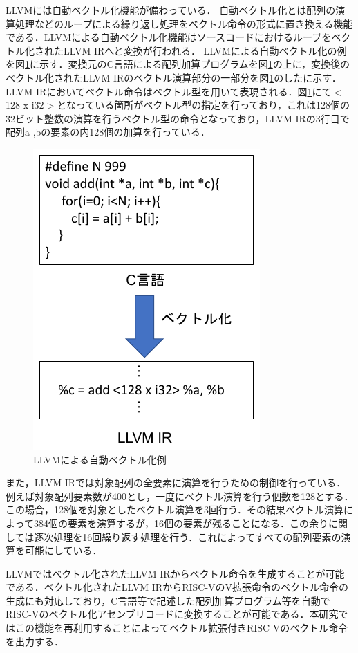 
LLVMには自動ベクトル化機能が備わっている．
自動ベクトル化とは配列の演算処理などのループによる繰り返し処理をベクトル命令の形式に置き換える機能である．LLVMによる自動ベクトル化機能はソースコードにおけるループをベクトル化されたLLVM IRへと変換が行われる．
LLVMによる自動ベクトル化の例を図\ref{fig:LLVM_auto_vec}に示す．変換元のC言語による配列加算プログラムを図\ref{fig:LLVM_auto_vec}の上に，変換後のベクトル化されたLLVM IRのベクトル演算部分の一部分を図\ref{fig:LLVM_auto_vec}のしたに示す．
LLVM IRにおいてベクトル命令はベクトル型を用いて表現される．図\ref{fig:LLVM_auto_vec}にて$<$128 x i32$>$となっている箇所がベクトル型の指定を行っており，これは128個の32ビット整数の演算を行うベクトル型の命令となっており，LLVM IRの3行目で配列a ,bの要素の内128個の加算を行っている．

\begin{figure}[tb]
    \centering
    \includegraphics[scale=0.7]{image/Auto_vectorize.pdf}
    \caption{LLVMによる自動ベクトル化例}
    \label{fig:LLVM_auto_vec}
\end{figure}

また，LLVM IRでは対象配列の全要素に演算を行うための制御を行っている．例えば対象配列要素数が400とし，一度にベクトル演算を行う個数を128とする．この場合，128個を対象としたベクトル演算を3回行う．その結果ベクトル演算によって384個の要素を演算するが，16個の要素が残ることになる．この余りに関しては逐次処理を16回繰り返す処理を行う．これによってすべての配列要素の演算を可能にしている．

LLVMではベクトル化されたLLVM IRからベクトル命令を生成することが可能である．ベクトル化されたLLVM IRからRISC-VのV拡張命令のベクトル命令の生成にも対応しており，C言語等で記述した配列加算プログラム等を自動でRISC-Vのベクトル化アセンブリコードに変換することが可能である．本研究ではこの機能を再利用することによってベクトル拡張付きRISC-Vのベクトル命令を出力する．